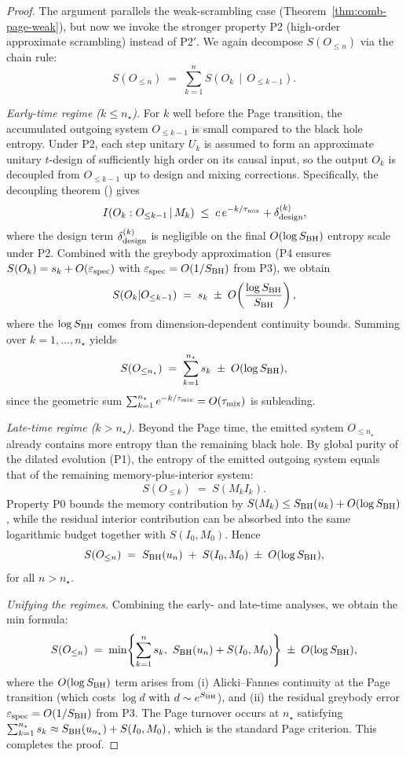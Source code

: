 \documentclass[a4paper,11pt]{article}
\theoremstyle{plain}
\theoremstyle{definition}
\theoremstyle{remark}
\begin{document}
\begin{proof}
The argument parallels the weak-scrambling case (Theorem~\ref{thm:comb-page-weak}), but now we invoke the stronger property P2 (high-order approximate scrambling) instead of P2$'$. We again decompose $S(O_{\le n})$ via the chain rule:
\[
S(O_{\le n}) \;=\; \sum_{k=1}^n S\!\left(O_k \,\middle|\, O_{\le k-1}\right).
\]

\emph{Early-time regime ($k\le n_\star$).}
For $k$ well before the Page transition, the accumulated outgoing system $O_{\le k-1}$ is small compared to the black hole entropy. Under P2, each step unitary $U_k$ is assumed to form an approximate unitary $t$-design of sufficiently high order on its causal input, so the output $O_k$ is decoupled from $O_{\le k-1}$ up to design and mixing corrections. Specifically, the decoupling theorem () gives
\[
I\!\left(O_k:O_{\le k-1}\,|\,M_k\right) \;\le\; c\,e^{-k/\tau_{\rm mix}} + \delta_{\rm design}^{(k)},
\]
where the design term $\delta_{\rm design}^{(k)}$ is negligible on the final $O(\log S_{\rm BH})$ entropy scale under P2. Combined with the greybody approximation (P4 ensures $S(O_k)=s_k+O(\varepsilon_{\rm spec})$ with $\varepsilon_{\rm spec}=O(1/S_{\rm BH})$ from P3), we obtain
\[
S(O_k|O_{\le k-1}) \;=\; s_k \;\pm\; O\!\left(\frac{\log S_{\rm BH}}{S_{\rm BH}}\right),
\]
where the $\log S_{\rm BH}$ comes from dimension-dependent continuity bounds. Summing over $k=1,\ldots,n_\star$ yields
\[
S(O_{\le n_\star}) \;=\; \sum_{k=1}^{n_\star} s_k \;\pm\; O(\log S_{\rm BH}),
\]
since the geometric sum $\sum_{k=1}^{n_\star} e^{-k/\tau_{\rm mix}}=O(\tau_{\rm mix})$ is subleading.

\emph{Late-time regime ($k> n_\star$).}
Beyond the Page time, the emitted system $O_{\le n_\star}$ already contains more entropy than the remaining black hole. By global purity of the dilated evolution (P1), the entropy of the emitted outgoing system equals that of the remaining memory-plus-interior system:
\[
S(O_{\le k}) \;=\; S(M_k I_k).
\]
Property P0 bounds the memory contribution by $S(M_k)\le S_{\rm BH}(u_k)+O(\log S_{\rm BH})$, while the residual interior contribution can be absorbed into the same logarithmic budget together with $S(I_0,M_0)$. Hence
\[
S(O_{\le n}) \;=\; S_{\rm BH}(u_n) \;+\; S(I_0,M_0) \;\pm\; O(\log S_{\rm BH}),
\]
for all $n>n_\star$.

\emph{Unifying the regimes.}
Combining the early- and late-time analyses, we obtain the min formula:
\[
S(O_{\le n}) \;=\; \min\!\left\{\sum_{k=1}^n s_k,\ S_{\rm BH}(u_n)+S(I_0,M_0)\right\} \;\pm\; O(\log S_{\rm BH}),
\]
where the $O(\log S_{\rm BH})$ term arises from (i) Alicki--Fannes continuity at the Page transition (which costs $\log d$ with $d\sim e^{S_{\rm BH}}$), and (ii) the residual greybody error $\varepsilon_{\rm spec}=O(1/S_{\rm BH})$ from P3. The Page turnover occurs at $n_\star$ satisfying $\sum_{k=1}^{n_\star} s_k \approx S_{\rm BH}(u_{n_\star})+S(I_0,M_0)$, which is the standard Page criterion. This completes the proof.
\end{proof}
\end{document}

